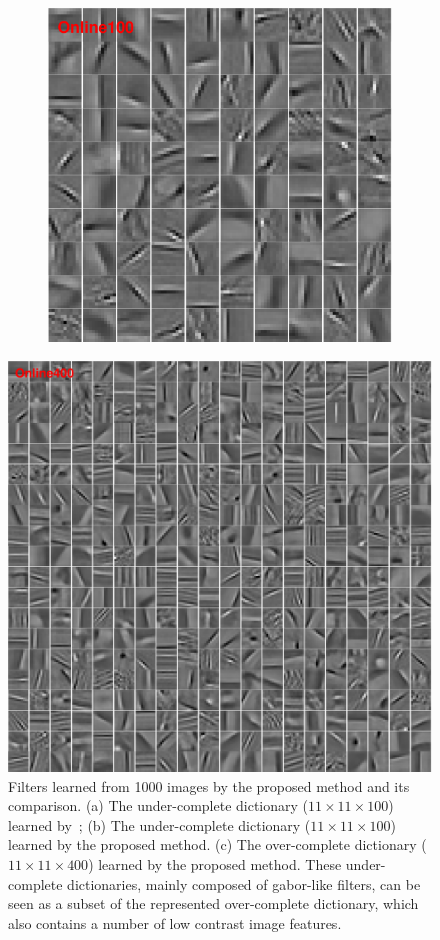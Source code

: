 \begin{figure}[h]
\begin{minipage}{0.4\textwidth}
\begin{subfigure}{1\textwidth}
    \centering
  \includegraphics[width=0.6\linewidth]{figure/online100-filter.pdf}
\end{subfigure}
\end{minipage}
\begin{minipage}{0.5\textwidth}
\centering
\includegraphics[width=1\linewidth]{figure/online400-filter.pdf}
\end{minipage}

\caption{Filters learned from 1000 images by the proposed method and its comparison. (a) The under-complete dictionary ($11 \times 11 \times 100$) learned by~\cite{liu-2018-first}; (b) The under-complete dictionary ($11 \times 11 \times 100$) learned by the proposed method. (c) The over-complete dictionary ($11 \times 11 \times 400$) learned by the proposed method. These under-complete dictionaries, mainly composed of gabor-like filters, can be seen as a subset of the represented over-complete dictionary, which also contains a number of low contrast image features.}
\label{fig:overCompleteDic}
\end{figure}